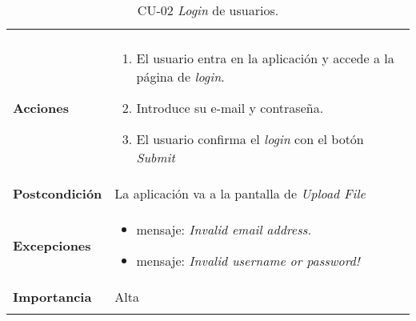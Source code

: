 \begin{longtable}[H]{@{}ll@{}}
\begin{minipage}[t]{0.71\columnwidth}
\end{minipage}\tabularnewline
\begin{minipage}[t]{0.23\columnwidth}\raggedright\strut
\textbf{Acciones}\strut
\end{minipage} & \begin{minipage}[t]{0.71\columnwidth}\raggedright\strut
\begin{enumerate}
\def\labelenumi{\arabic{enumi}.}
\tightlist
\item
  El usuario entra en la aplicación y accede a la página de \emph{login}.
\item
  Introduce su e-mail y contraseña.
\item
  El usuario confirma el \emph{login} con el botón \emph{Submit}
\end{enumerate}\strut
\end{minipage}\tabularnewline
\begin{minipage}[t]{0.23\columnwidth}\raggedright\strut
\textbf{Postcondición}\strut
\end{minipage} & \begin{minipage}[t]{0.71\columnwidth}\raggedright\strut
La aplicación va a la pantalla de \emph{Upload File}
\end{minipage}\tabularnewline
\begin{minipage}[t]{0.23\columnwidth}\raggedright\strut
\textbf{Excepciones}\strut
\end{minipage} & \begin{minipage}[t]{0.71\columnwidth}\raggedright\strut
\begin{itemize}
\tightlist
\item
  mensaje: \textit{Invalid email address.}
\item
  mensaje: \textit{Invalid username or password!}
  
\end{itemize}\strut
\end{minipage}\tabularnewline
\begin{minipage}[t]{0.23\columnwidth}\raggedright\strut
\textbf{Importancia}\strut
\end{minipage} & \begin{minipage}[t]{0.71\columnwidth}\raggedright\strut
Alta\strut
\end{minipage}\tabularnewline
\bottomrule
\caption{CU-02 \emph{Login} de usuarios.}
\end{longtable}
\strut


